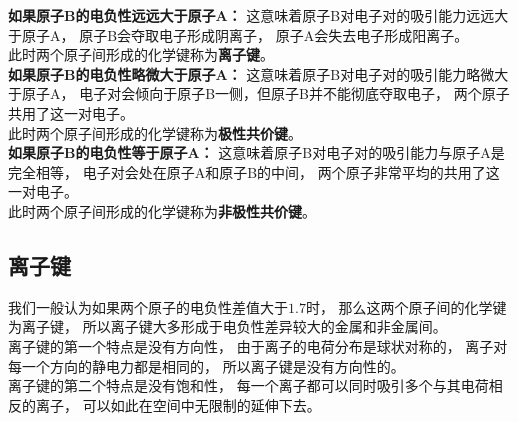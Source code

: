 \documentclass[UTF8]{ctexart}
\begin{document}
    \textbf{如果原子B的电负性远远大于原子A：}
    这意味着原子B对电子对的吸引能力远远大于原子A，
    原子B会夺取电子形成阴离子，
    原子A会失去电子形成阳离子。\\[2mm]
    此时两个原子间形成的化学键称为\textbf{离子键}。\\[3mm]

    \textbf{如果原子B的电负性略微大于原子A：}
    这意味着原子B对电子对的吸引能力略微大于原子A，
    电子对会倾向于原子B一侧，但原子B并不能彻底夺取电子，
    两个原子共用了这一对电子。\\[2mm]
    此时两个原子间形成的化学键称为\textbf{极性共价键}。\\[3mm]

    \textbf{如果原子B的电负性等于原子A：}
    这意味着原子B对电子对的吸引能力与原子A是完全相等，
    电子对会处在原子A和原子B的中间，
    两个原子非常平均的共用了这一对电子。\\[2mm]
    此时两个原子间形成的化学键称为\textbf{非极性共价键}。

\newpage

\subsection{离子键}
    我们一般认为如果两个原子的电负性差值大于$1.7$时，
    那么这两个原子间的化学键为离子键，
    所以离子键大多形成于电负性差异较大的金属和非金属间。\\[3mm]
    离子键的第一个特点是没有方向性，
    由于离子的电荷分布是球状对称的，
    离子对每一个方向的静电力都是相同的，
    所以离子键是没有方向性的。\\[3mm]
    离子键的第二个特点是没有饱和性，
    每一个离子都可以同时吸引多个与其电荷相反的离子，
    可以如此在空间中无限制的延伸下去。\\
\end{document}
